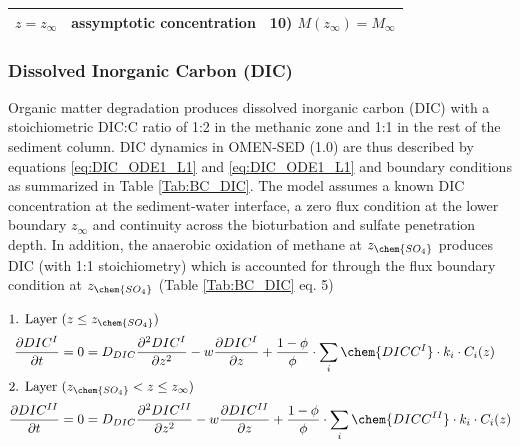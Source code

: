 \documentclass[gmd, manuscript]{copernicus}
\begin{document}
\begin{table}[tbp]
\begin{tabular}{ |l| l| l|}
$z=z_{\infty}$& assymptotic concentration & 10) $M(z_\infty)=M_\infty$\\
\hline    
\end{tabular}
\label{Tab:BC_PO4+M}
\end{table}

\subsubsection{Dissolved Inorganic Carbon (DIC)}
Organic matter degradation produces dissolved inorganic carbon (DIC) with a stoichiometric DIC:C ratio of 1:2 in the methanic zone and 1:1 in the rest of the sediment column. 
DIC dynamics in OMEN-SED (1.0) are thus described by equations \ref{eq:DIC_ODE1_L1} and \ref{eq:DIC_ODE1_L1} and boundary conditions as summarized in Table \ref{Tab:BC_DIC}. 
The model assumes a known DIC concentration at the sediment-water interface, a zero flux condition at the lower boundary $z_\infty$ and continuity across the bioturbation and sulfate penetration depth. 
In addition, the anaerobic oxidation of methane at $z_{\chem{SO_4}}$ produces DIC (with 1:1 stoichiometry) which is accounted for through the flux boundary condition 
at $z_{\chem{SO_4}}$ (Table \ref{Tab:BC_DIC} eq. 5)

\begin{align}
\intertext{1. Layer ($z \leq z_{\chem{SO_4}}$)}
  \frac{\partial DIC^I}{\partial t} &= 0 = D_{DIC} \frac{\partial^2DIC^I }{\partial z^2} - w\frac{\partial DIC^I }{\partial z} + \frac{1-\phi}{\phi} \cdot \sum_i \chem{DICC^I} \cdot k_i \cdot C_{i}(z)\label{eq:DIC_ODE1_L1}\\ %
 \intertext{2. Layer ($z_{\chem{SO_4}} < z \leq z_\infty$)} 
  \frac{\partial DIC^{II}}{\partial t} &= 0 = D_{DIC} \frac{\partial^2DIC^{II} }{\partial z^2} - w\frac{\partial DIC^{II} }{\partial z} + \frac{1-\phi}{\phi} \cdot \sum_i \chem{DICC^{II}} \cdot k_i \cdot C_{i}(z)\label{eq:DIC_ODE1_L2} %
\end{align}
\end{document}
